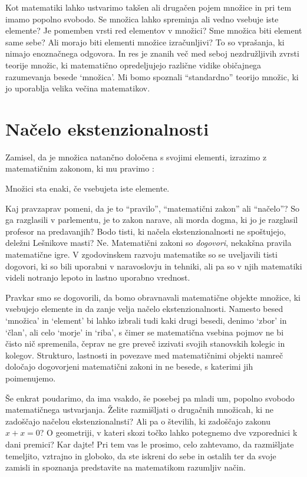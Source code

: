 Kot matematiki lahko ustvarimo takšen ali drugačen pojem množice in pri tem imamo popolno
svobodo. Se množica lahko spreminja ali vedno vsebuje iste elemente? Je pomemben vrsti red
elementov v množici? Sme množica biti element same sebe? Ali morajo biti elementi množice
izračunljivi? To so vprašanja, ki nimajo enoznačnega odgovora. In res je znanih več med
seboj nezdružljivih zvrsti teorije množic, ki matematično opredeljujejo različne vidike
običajnega razumevanja besede `množica'. Mi bomo spoznali ``standardno'' teorijo množic,
ki jo uporablja velika večina matematikov.


\section{Načelo ekstenzionalnosti}
\label{sec:nacelo-ekstenzionalnosti}

Zamisel, da je množica natančno določena s svojimi elementi, izrazimo z matematičnim
zakonom, ki mu pravimo :

\begin{pravilo}
  Množici sta enaki, če vsebujeta iste elemente.
\end{pravilo}

Kaj pravzaprav pomeni, da je to ``pravilo'', ``matematični zakon'' ali ``načelo''? So ga
razglasili v parlementu, je to zakon narave, ali morda dogma, ki jo je razglasil profesor
na predavanjih? Bodo tisti, ki načela ekstenzionalnosti ne spoštujejo, deležni Lešnikove
masti? Ne. Matematični zakoni so \emph{dogovori}, nekakšna pravila matematične igre. V
zgodovinskem razvoju matematike so se uveljavili tisti dogovori, ki so bili uporabni v
naravoslovju in tehniki, ali pa so v njih matematiki videli notranjo lepoto in lastno
uporabno vrednost.

Pravkar smo se dogovorili, da bomo obravnavali matematične objekte množice, ki vsebujejo
elemente in da zanje velja načelo ekstenzionalnosti. Namesto besed `množica' in `element'
bi lahko izbrali tudi kaki drugi besedi, denimo `zbor' in `član', ali celo `morje' in
`riba', s čimer se matematična vsebina pojmov ne bi čisto nič spremenila, čeprav ne gre
preveč izzivati svojih stanovskih kolegic in kolegov. Strukturo, lastnosti in povezave med
matematičnimi objekti namreč določajo dogovorjeni matematični zakoni in ne besede, s
katerimi jih poimenujemo.

Še enkrat poudarimo, da ima vsakdo, še posebej pa mladi um, popolno svobodo matematičnega
ustvarjanja. Želite razmišljati o drugačnih množicah, ki ne zadoščajo načelou
ekstenzionalnsti? Ali pa o številih, ki zadoščajo zakonu $x + x = 0$? O geometriji, v
kateri skozi točko lahko potegnemo dve vzporednici k dani premici? Kar dajte! Pri tem vas
le prosimo, celo zahtevamo, da razmišljate temeljito, vztrajno in globoko, da ste iskreni
do sebe in ostalih ter da svoje zamisli in spoznanja predstavite na matematikom razumljiv
način.

